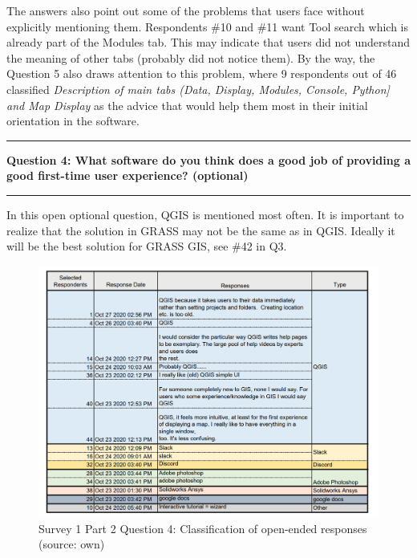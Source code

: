 \documentclass[a4paper,10pt,twoside]{article}
\begin{document}
The answers also point out some of the problems that users face without explicitly mentioning them. Respondents \#10 and \#11 want Tool search which is already part of the Modules tab. This may indicate that users did not understand the meaning of other tabs (probably did not notice them). By the way, the Question 5 also draws attention to this problem, where 9 respondents out of 46 classified \textit{Description of main tabs (Data, Display, Modules, Console, Python] and Map Display} as the advice that would help them most in their initial orientation in the software.

\par\noindent\rule{\textwidth}{0.4pt}
\noindent \textbf{Question 4: What software do you think does a good job of providing a good first-time user experience? (optional)}
\par\noindent\rule{\textwidth}{0.4pt}
\noindent In this open optional question, QGIS is mentioned most often. It is important to realize that the solution in GRASS may not be the same as in QGIS. Ideally it will be the best solution for GRASS GIS, see \#42 in Q3.

\vspace{0.3cm}
\begin{figure}[hbt!] 
\begin{center}
\includegraphics[width=16cm]{../surveys/analyzed_data/survey1_part2_question4_open_ended_1.png} 
\caption[Survey 1 Part 2 Question 4: Classification of open-ended responses]{Survey 1 Part 2 Question 4: Classification of open-ended responses (source: own)}
\label{fig:survey1_part2_question4_open_ended_1}
\end{center}
\end{figure}
\end{document}
